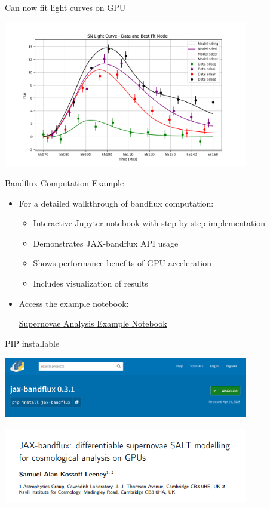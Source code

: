 \documentclass[aspectratio=169]{beamer}
\begin{document}
\begin{frame}{Can now fit light curves on GPU}
  \begin{center}
    \includegraphics[width=0.8\textwidth]{images/sncosmo-fitter.png}
  \end{center}
\end{frame}


\begin{frame}{Bandflux Computation Example}
  \begin{itemize}
    \item For a detailed walkthrough of bandflux computation:
    \begin{itemize}
      \item Interactive Jupyter notebook with step-by-step implementation
      \item Demonstrates JAX-bandflux API usage
      \item Shows performance benefits of GPU acceleration
      \item Includes visualization of results
    \end{itemize}
    \item Access the example notebook:
    \begin{center}
      \href{https://github.com/handley-lab/nested-sampling-book/blob/main/physics/supernovae.ipynb}{Supernovae Analysis Example Notebook}
    \end{center}
  \end{itemize}
\end{frame}
\begin{frame}{PIP installable}
  \vfill
  \begin{center}
    \includegraphics[width=0.8\textwidth]{images/jaxbandflux-pip.png}
  \end{center}
  \vfill
  \begin{center}
    \includegraphics[width=0.8\textwidth]{images/jaxbandflux-paper.png}
  \end{center}
  \vfill
\end{frame}
\end{document}
